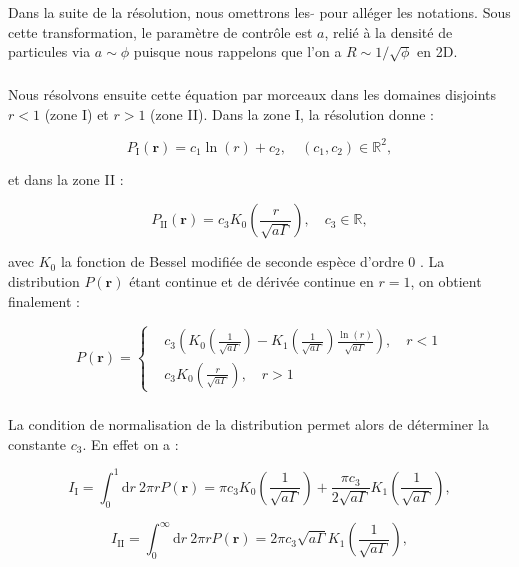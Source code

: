 \noindent Dans la suite de la résolution, nous omettrons les $\tilde{}$ pour alléger les notations. Sous cette transformation, le paramètre de contrôle est $a$, relié à la densité de particules via $a\sim \phi$ puisque nous rappelons que l'on a $R\sim 1/\sqrt{\phi}$ en 2D.

\subparagraph{}Nous résolvons ensuite cette équation par morceaux dans les domaines disjoints $r<1$ (zone I) et $r>1$ (zone II). Dans la zone I, la résolution donne :

\begin{equation}
	P_\text{I}(\mathbf{r}) = c_1 \ln (r) + c_2, \quad (c_1, c_2) \in \mathbb{R}^2,
\end{equation}

\noindent et dans la zone II :

\begin{equation}
	P_\text{II}(\mathbf{r}) = c_3 K_0\left( \frac{r}{\sqrt{a\Gamma}} \right), \quad c_3 \in \mathbb{R},
\end{equation}

\noindent avec $K_0$ la fonction de Bessel modifiée de seconde espèce d'ordre 0 \cite{abramowitz_handbook_1965}. La distribution $P(\mathbf{r})$ étant continue et de dérivée continue en $r=1$, on obtient finalement :

\begin{equation}
P(\mathbf{r}) = \left\{
    \begin{aligned}
    & c_3 \left( K_0\left( \frac{1}{\sqrt{a\Gamma}} \right) -K_1\left( \frac{1}{\sqrt{a\Gamma}} \right)\frac{\ln (r)}{\sqrt{a\Gamma}}\right), \quad r<1\\
    & c_3 K_0\left( \frac{r}{\sqrt{a\Gamma}} \right), \quad r>1
    \end{aligned}
    \right.
\end{equation}

\subparagraph{}La condition de normalisation de la distribution permet alors de déterminer la constante $c_3$. En effet on a :

\begin{equation}
	I_\text{I} = \int_0^1 \mathrm{d}r~ 2\pi r P(\mathbf{r}) = \pi c_3 K_0\left( \frac{1}{\sqrt{a\Gamma}} \right) + \frac{\pi c_3}{2\sqrt{a\Gamma}}K_1\left( \frac{1}{\sqrt{a\Gamma}} \right),
\end{equation}

\begin{equation}
	I_\text{II} = \int_0^\infty \mathrm{d}r~ 2\pi r P(\mathbf{r}) = 2\pi c_3 \sqrt{a\Gamma}K_1\left( \frac{1}{\sqrt{a\Gamma}} \right),
\end{equation}


